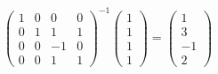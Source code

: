 \documentclass[12pt,fontset=fandol]{ctexart}
\begin{document}
\begin{solve}
\begin{enumerate}
\[\begin{pmatrix}
                              1 & 0 & 0  & 0 \\
                              0 & 1 & 1  & 1 \\
                              0 & 0 & -1 & 0 \\
                              0 & 0 & 1  & 1
                          \end{pmatrix}^{-1} \begin{pmatrix} 1 \\ 1 \\ 1 \\ 1 \end{pmatrix} = \begin{pmatrix} 1 \\ 3 \\ -1 \\ 2 \end{pmatrix} \]
            \end{enumerate}
\end{solve}
\end{document}
